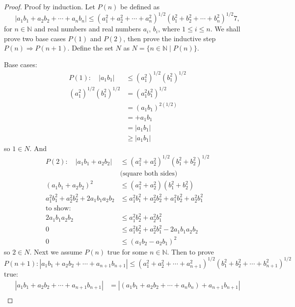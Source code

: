 \documentclass[11pt,twoside, reqno, align]{amsart}
\theoremstyle{remark}
\def\N{\mathbb N}
\renewcommand{\implies}{\Rightarrow}
\begin{document}
\begin{proof}
Proof by induction. Let $P(n)$ be defined as
$$
|a_1b_1+a_2b_2+\cdots+a_nb_n|\leq (a_1^2+a_2^2+\cdots+a_n^2)^{1/2}(b_1^2+b_2^2+\cdots+b_n^2)^{1/2}7,
$$
for $n \in \N$ and real numbers and real numbers $a_i$, $b_i$, where $1\leq i\leq n$. We shall prove two base cases $P(1)$ and $P(2)$, then prove the inductive step $P(n) \implies P(n+1)$. Define the set $N$ as $N = \{ n \in \N \mid P(n)\}$. 

Base cases:
\begin{align*}
    P(1): \quad |a_1b_1| & \leq (a_1^2)^{1/2}(b_1^2)^{1/2} \\
    (a_1^2)^{1/2}(b_1^2)^{1/2} & = (a_1^2b_1^2)^{1/2} \\
    & = (a_1b_1)^{2(1/2)} \\
    & = +a_1b_1 \\
    & = |a_1b_1| \\
    & \geq |a_1b_1|
\end{align*}
so $1 \in N$. And
\begin{align*}
    P(2): \quad |a_1b_1 + a_2b_2| & \leq (a_1^2 + a_2^2)^{1/2}(b_1^2 + b_2^2)^{1/2} \\
    & \text{(square both sides)} \\
    (a_1b_1 + a_2b_2)^2 & \leq  (a_1^2 + a_2^2)(b_1^2 + b_2^2) \\
    a_1^2b_1^2 + a_2^2b_2^2 + 2a_1b_1a_2b_2 & \leq a_1^2b_1^2 + a_2^2b_2^2 + a_1^2b_2^2 + a_2^2b_1^2 \\
    \text{to show:} \\
    2a_1b_1a_2b_2 & \leq a_1^2b_2^2 + a_2^2b_1^2 \\
    0 & \leq a_1^2b_2^2 + a_2^2b_1^2 - 2a_1b_1a_2b_2 \\
    0 & \leq (a_1b_2 - a_2b_1)^2
\end{align*}
so $2 \in N$. Next we assume $P(n)$ true for some $n \in \N$. Then to prove $P(n+1): |a_1b_1+a_2b_2+\cdots+a_{n+1}b_{n+1}| \leq (a_1^2+a_2^2+\cdots+a_{n+1}^2)^{1/2}(b_1^2+b_2^2+\cdots+b_{n+1}^2)^{1/2}$ true:
\begin{align*}
    |a_1b_1+a_2b_2+ \cdots +a_{n+1}b_{n+1}| & = |(a_1b_1+a_2b_2+ \cdots +a_nb_n) + a_{n+1}b_{n+1}| \\

\end{align*}
\end{proof}
\end{document}
